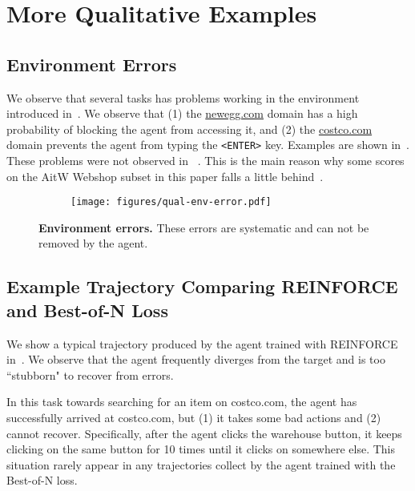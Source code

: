 
\section{More Qualitative Examples}

\subsection{Environment Errors} \label{app:env-errors}

We observe that several tasks has problems working in the environment introduced in~\citet{bai2024digirltraininginthewilddevicecontrol}. We observe that (1) the \url{newegg.com} domain has a high probability of blocking the agent from accessing it, and (2) the \url{costco.com} domain prevents the agent from typing the \texttt{<ENTER>} key. Examples are shown in~. These problems were not observed in ~\citet{bai2024digirltraininginthewilddevicecontrol}. This is the main reason why some scores on the AitW Webshop subset in this paper falls a little behind~\citet{bai2024digirltraininginthewilddevicecontrol}.

\begin{figure}[!htp]
     \centering
    \begin{subfigure}[b]{0.85\textwidth}
         \centering
    \texttt{[image: figures/qual-env-error.pdf]}
     \end{subfigure}
        \caption{\textbf{Environment errors.} These errors are systematic and can not be removed by the agent.}
        \label{fig:qual-env-error}
\end{figure}


\subsection{Example Trajectory Comparing REINFORCE and Best-of-N Loss} \label{app:pg-example}

We show a typical trajectory produced by the agent trained with REINFORCE in~. We observe that the agent frequently diverges from the target and is too ``stubborn" to recover from errors. 

In this task towards searching for an item on costco.com, the agent has successfully arrived at costco.com, but (1) it takes some bad actions and (2) cannot recover. Specifically, after the agent clicks the warehouse button, it keeps clicking on the same button for 10 times until it clicks on somewhere else. This situation rarely appear in any trajectories collect by the agent trained with the Best-of-N loss.

